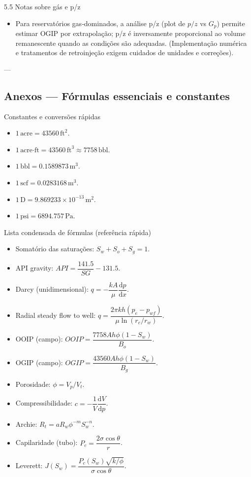 \documentclass[11pt,a4paper]{article}
\begin{document}
5.5 Notas sobre gás e p/z
\begin{itemize}
\item Para reservatórios gas‑dominados, a análise p/z (plot de $p/z$ vs $G_p$) permite estimar OGIP por extrapolação; p/z é inversamente proporcional ao volume remanescente quando as condições são adequadas. (Implementação numérica e tratamentos de retroinjeção exigem cuidados de unidades e correções).
\end{itemize}

---

\subsection{Anexos — Fórmulas essenciais e constantes}

Constantes e conversões rápidas
\begin{itemize}
\item $1\,\text{acre}=43560\,\text{ft}^2$.
\item $1\,\text{acre·ft}=43560\,\text{ft}^3\approx7758\,\text{bbl}$.
\item $1\,\text{bbl}=0.1589873\,\text{m}^3$.
\item $1\,\text{scf}=0.0283168\,\text{m}^3$.
\item $1\,\text{D}=9.869233\times10^{-13}\,\text{m}^2$.
\item $1\,\text{psi}=6894.757\,\text{Pa}$.
\end{itemize}

Lista condensada de fórmulas (referência rápida)
\begin{itemize}
\item Somatório das saturações: $S_w+S_o+S_g=1$.
\item API gravity: $API=\dfrac{141.5}{SG}-131.5$.
\item Darcy (unidimensional): $q=-\dfrac{kA}{\mu}\dfrac{\mathrm{d}p}{\mathrm{d}x}$.
\item Radial steady flow to well: $q=\dfrac{2\pi k h (p_e-p_{wf})}{\mu\ln(r_e/r_w)}$.
\item OOIP (campo): $OOIP=\dfrac{7758Ah\phi(1-S_w)}{B_o}$.
\item OGIP (campo): $OGIP=\dfrac{43560Ah\phi(1-S_w)}{B_g}$.
\item Porosidade: $\phi=V_p/V_t$.
\item Compressibilidade: $c= -\dfrac{1}{V}\dfrac{\mathrm{d}V}{\mathrm{d}p}$.
\item Archie: $R_t=aR_w\phi^{-m}S_w^{-n}$.
\item Capilaridade (tubo): $P_c=\dfrac{2\sigma\cos\theta}{r}$.
\item Leverett: $J(S_w)=\dfrac{P_c(S_w)\sqrt{k/\phi}}{\sigma\cos\theta}$.
\end{itemize}
\end{document}
